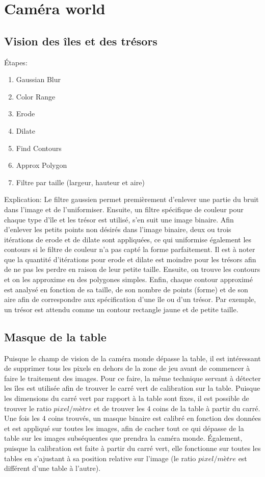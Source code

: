 \section{Caméra world} 

\subsection{Vision des îles et des trésors}

Étapes:
\begin{enumerate}
\item Gaussian Blur
\item Color Range
\item Erode
\item Dilate
\item Find Contours
\item Approx Polygon
\item Filtre par taille (largeur, hauteur et aire)
\end{enumerate}


Explication: Le filtre gaussien permet premièrement d'enlever une partie du bruit dans l'image et de l'uniformiser. Ensuite, un filtre spécifique de couleur pour chaque type d'île et les trésor est utilisé, s'en suit une image binaire. Afin d'enlever les petits points non désirés dans l'image binaire, deux ou trois itérations de erode et de dilate sont appliquées, ce qui uniformise également les contours si le filtre de couleur n'a pas capté la forme parfaitement. Il est à noter que la quantité d'itérations pour erode et dilate est moindre pour les trésors afin de ne pas les perdre en raison de leur petite taille. Ensuite, on trouve les contours et on les approxime en des polygones simples. Enfin, chaque contour approximé est analysé en fonction de sa taille, de son nombre de points (forme) et de son aire afin de correspondre aux spécification d'une île ou d'un trésor. Par exemple, un trésor est attendu comme un contour rectangle jaune et de petite taille.

\subsection{Masque de la table}

Puisque le champ de vision de la caméra monde dépasse la table, il est intéressant de supprimer tous les pixels en dehors de la zone de jeu avant de commencer à faire le traitement des images. Pour ce faire, la même technique servant à détecter les îles est utilisée afin de trouver le carré vert de calibration sur la table. Puisque les dimensions du carré vert par rapport à la table sont fixes, il est possible de trouver le ratio $pixel/mètre$ et de trouver les 4 coins de la table à partir du carré. Une fois les 4 coins trouvés, un masque binaire est calibré en fonction des données et est appliqué sur toutes les images, afin de cacher tout ce qui dépasse de la table sur les images subséquentes que prendra la caméra monde. Également, puisque la calibration est faite à partir du carré vert, elle fonctionne sur toutes les tables en s'ajustant à sa position relative sur l'image (le ratio $pixel/mètre$ est différent d'une table à l'autre).


